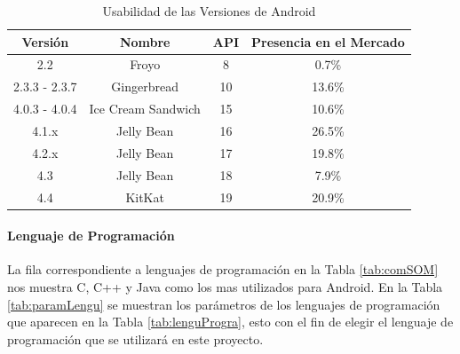 \begin{table} 
	\begin{center}
		\begin{tabular}{|c|c|c|c|}
			\hline \rowcolor[RGB]{51,153,255} 
			\textcolor{blanco}{\bf Versión} &
				\textcolor{blanco}{\bf Nombre} &
				\textcolor{blanco}{\bf API} &
				\textcolor{blanco}{\bf Presencia en el Mercado} \\
			\hline  
				2.2 &
				Froyo &
				8 &
				0.7\% \\
      		\hline \rowcolor[RGB]{240,248,255}
      			2.3.3 - 2.3.7 &
				Gingerbread &
				10 &
				13.6\% \\
      		\hline 
      			4.0.3 - 4.0.4 &
				Ice Cream Sandwich &
				15 &
				10.6\% \\
      		\hline \rowcolor[RGB]{240,248,255}
      			4.1.x &
				Jelly Bean &
				16 &
				26.5\% \\
      		\hline 
      			4.2.x &
				Jelly Bean &
				17 &
				19.8\% \\
      		\hline \rowcolor[RGB]{240,248,255}
      			4.3 &
				Jelly Bean &
				18 &
				7.9\% \\
      		\hline 
      			4.4 &
				KitKat &
				19 &
				20.9\% \\
      		\hline 
		\end{tabular}
	\end{center}
	\caption[Usabilidad de las Versiones de Android]{Usabilidad de las Versiones de Android \cite{devAndroid}} 
	\label{tab:versionesTabla}
\end{table}

\paragraph{Lenguaje de Programación}

La fila correspondiente a lenguajes de programación en la Tabla \ref{tab:comSOM} nos muestra C, C++ y Java como los mas utilizados para Android. En la Tabla \ref{tab:paramLengu} se muestran los parámetros de los lenguajes de programación que aparecen en la Tabla \ref{tab:lenguProgra}, esto con el fin de elegir el lenguaje de programación que se utilizará en este proyecto. 

